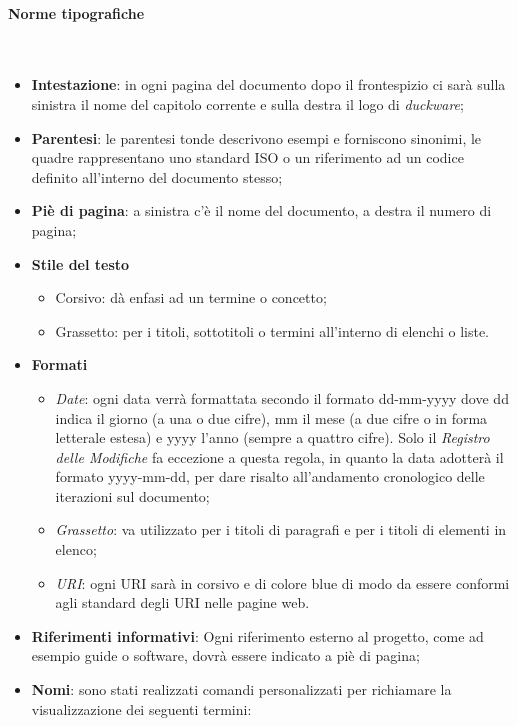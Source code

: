 \paragraph{Norme tipografiche}\mbox{}\\[0.4cm]
\begin{itemize}
    \item \textbf{Intestazione}: in ogni pagina del documento dopo il frontespizio ci sarà sulla sinistra il nome del capitolo corrente e sulla destra il logo di \emph{duckware};
    \item \textbf{Parentesi}: le parentesi tonde descrivono esempi e forniscono sinonimi, le quadre rappresentano uno standard ISO o un riferimento ad un codice definito all’interno del documento stesso;
    \item \textbf{Piè di pagina}: a sinistra c’è il nome del documento, a destra il numero di pagina;
    \item \textbf{Stile del testo}
    \begin{itemize}
        \item Corsivo: dà enfasi ad un termine o concetto;
        \item Grassetto: per i titoli, sottotitoli o termini all’interno di elenchi o liste.
    \end{itemize}
    \item \textbf{Formati}
    \begin{itemize}
        \item \emph{Date}: ogni data verrà formattata secondo il formato dd-mm-yyyy dove dd indica il giorno (a una o due cifre), mm il mese (a due cifre o in forma letterale estesa) e yyyy l’anno (sempre a quattro cifre). Solo il \emph{Registro delle Modifiche} fa eccezione a questa regola, in quanto la data   adotterà il formato yyyy-mm-dd, per dare risalto all'andamento cronologico delle iterazioni sul documento;
        \item \emph{Grassetto}: va utilizzato per i titoli di paragrafi e per i titoli di elementi in elenco;
        \item \emph{URI}: ogni URI sarà in corsivo e di colore blue di modo da essere conformi agli standard degli URI nelle pagine web.
    \end{itemize}
    \item \textbf{Riferimenti informativi}: Ogni riferimento esterno al progetto, come ad esempio guide o software, dovrà essere indicato a piè di pagina;
    \item \textbf{Nomi}: sono stati realizzati comandi personalizzati per richiamare la visualizzazione dei seguenti termini:

\end{itemize}
